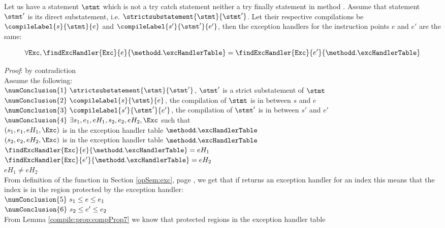 \begin{compProp8A}
  Let us have a statement $\stmt$ which is not a try catch statement  neither a try finally statement in method \methodd. Assume that 
  statement $\stmt'$ is its direct substatement, i.e. 
$\strictsubstatement{\stmt}{\stmt'} $. Let 
 their respective compilations be  $\compileLabel{s}{\stmt}{e}$ and  $\compileLabel{s'}{\stmt'}{e'}$, then  the exception handlers for the instruction points $e$ and $e'$ are the same:

$$   \forall \mbox{\rm\tt{Exc}}, 
	  \findExcHandler{\mbox{\rm\tt{Exc}} }{e}{\methodd.\excHandlerTable} = \findExcHandler{\mbox{\rm\tt{Exc}} }{e'}{\methodd.\excHandlerTable} $$
\end{compProp8A}
\textit{Proof}: by contradiction \\
Assume the following: \\
$\numConclusion{1} \ \strictsubstatement{\stmt}{\stmt'} $, $\stmt'$ is a strict substatement of $\stmt$ \\
$\numConclusion{2} \ \compileLabel{s}{\stmt}{e}$,  the compilation of $\stmt$  is in between $s$ and $e$ \\
$\numConclusion{3} \ \compileLabel{s'}{\stmt'}{e'}$, the compilation of $\stmt'$  is in between $s'$ and $e'$   \\
$\numConclusion{4} \ \exists s_1, e_1, eH_1, s_2, e_2, eH_2, \Exc $ such that\\
   $ (s_1,e_1, eH_1, \Exc )$ is in the exception handler table $\methodd.\excHandlerTable$\\
   $ (s_2,e_2, eH_2, \Exc )$ is in the exception handler table $\methodd.\excHandlerTable$\\
   $\findExcHandler{\mbox{\rm\tt{Exc}} }{e}{\methodd.\excHandlerTable} = eH_1$  \\
   $\findExcHandler{\mbox{\rm\tt{Exc}} }{e'}{\methodd.\excHandlerTable} = eH_2$  \\
   $ eH_1 \neq  eH_2  $ \\
From definition of the function  \findExcHandlerOnly{} in Section \ref{opSem:exc}, page \pageref{opSem:exc}, we get that if \findExcHandlerOnly{}
returns an exception handler  for an index  this means that the index is in the region protected by the exception handler:\\
$\numConclusion{5} \  s_1 \le e \le e_1$ \\
$\numConclusion{6} \  s_2 \le e' \le e_2$ \\
From Lemma \ref{compile:prop:compProp7} we know that protected regions in the exception handler table 
